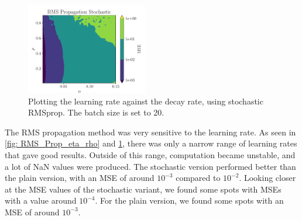 \begin{figure}[ht!]
    \centering
    \includegraphics[width = 0.475\textwidth]{../figs/RMS_Prop_stochastic_eta_rho.pdf}
    \caption{Plotting the learning rate against the decay rate, using stochastic RMSprop. The batch size is set to 20.}
    \label{fig: RMS_Prop_stochastic_eta_rho}
\end{figure}
The RMS propagation method was very sensitive to the learning rate. As seen in \cref{fig: RMS_Prop_eta_rho} and \cref{fig: RMS_Prop_stochastic_eta_rho}, there was only a narrow range of learning rates that gave good results. Outside of this range, computation became unstable, and a lot of NaN values were produced. The stochastic version performed better than the plain version, with an MSE of around \(10^{-3}\) compared to \(10^{-2}\). Looking closer at the MSE values of the stochastic variant, we found some spots with MSEs with a value around \( 10^{-4} \). For the plain version, we found some spots with an MSE of around \( 10^{-3} \).

